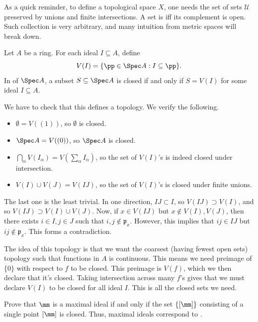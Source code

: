 As a quick reminder, to define a topological space $X$,
one needs the set of  sets $\mathcal U$
preserved by unions and finite intersections.
A set is  iff its complement is open.
Such collection is very arbitrary,
and many intuition from metric spaces will break down.
\begin{definition}
    Let $A$ be a ring. For each ideal $I\subseteq A$, define 
    $$V(I) = \{\pp\in\Spec A : I\subseteq \pp\}.$$
    In  of $\Spec A$,
    a subset $S\subseteq\Spec A$
    is closed if and only if $S=V(I)$ for some ideal $I\subseteq A$.
\end{definition}
We have to check that this defines a topology.
We verify the following.
\begin{itemize}
    \item $\emptyset = V((1))$, so $\emptyset$ is closed.
    \item $\Spec A = V((0))$, so $\Spec A$ is closed.
    \item $\bigcap_\alpha V(I_\alpha) 
	= V\left(\sum_\alpha I_\alpha\right)$,
	so the set of $V(I)$'s is indeed closed under intersection.
    \item $V(I)\cup V(J) = V(IJ)$,
	so the set of $V(I)$'s is closed under finite unions.
\end{itemize}
The last one is the least trivial.
In one direction, $IJ\subset I$, so $V(IJ)\supset V(I)$,
and so $V(IJ)\supset V(I)\cup V(J)$.
Now, if $x\in V(IJ)$ but $x\notin V(I), V(J)$,
then there exists $i\in I, j\in J$ such that
$i,j\notin\mathfrak p_x$.
However, this implies that $ij\in IJ$ but
$ij\notin\mathfrak p_x$. This forms a contradiction.

The idea of this topology is that we want the coarsest 
(having fewest open sets) topology
such that functions in $A$ is continuous.
This means we need preimage of $\{0\}$ 
with respect to $f$ to be closed. This preimage is $V(f)$,
which we then declare that it's closed.
Taking intersection across many $f$'s gives that
we must declare $V(I)$ to be closed for all ideal $I$.
This is all the closed sets we need.

\begin{exercise}
    Prove that $\mm$ is a maximal ideal if and only if
    the set $\{[\mm]\}$ consisting of a single point
    $[\mm]$ is closed.
    Thus, maximal ideals correspond to .
\end{exercise}

